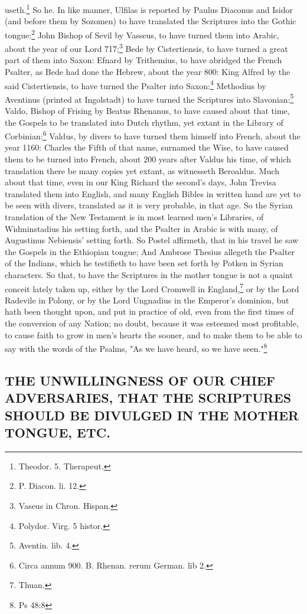 useth.\footnote{Theodor. 5. Therapeut.} So he. In like manner, Ulfilas is reported by Paulus Diaconus and Isidor (and before them by Sozomen) to have translated the Scriptures into the Gothic tongue:\footnote{P. Diacon. li. 12.} John Bishop of Sevil by Vasseus, to have turned them into Arabic, about the year of our Lord 717;\footnote{Vaseus in Chron. Hispan.} Bede by Cistertiensis, to have turned a great part of them into Saxon: Efnard by Trithemius, to have abridged the French Psalter, as Bede had done the Hebrew, about the year 800: King Alfred by the said Cistertiensis, to have turned the Psalter into Saxon:\footnote{Polydor. Virg. 5 histor.} Methodius by Aventinus (printed at Ingolstadt) to have turned the Scriptures into Slavonian:\footnote{Aventin. lib. 4.} Valdo, Bishop of Frising by Beatus Rhenanus, to have caused about that time, the Gospels to be translated into Dutch rhythm, yet extant in the Library of Corbinian:\footnote{Circa annum 900. B. Rhenan. rerum German. lib 2.} Valdus, by divers to have turned them himself into French, about the year 1160: Charles the Fifth of that name, surnamed the Wise, to have caused them to be turned into French, about 200 years after Valdus his time, of which translation there be many copies yet extant, as witnesseth Beroaldus. Much about that time, even in our King Richard the second's days, John Trevisa translated them into English, and many English Bibles in written hand are yet to be seen with divers, translated as it is very probable, in that age. So the Syrian translation of the New Testament is in most learned men's Libraries, of Widminstadius his setting forth, and the Psalter in Arabic is with many, of Augustinus Nebiensis' setting forth. So Postel affirmeth, that in his travel he saw the Gospels in the Ethiopian tongue; And Ambrose Thesius allegeth the Psalter of the Indians, which he testifieth to have been set forth by Potken in Syrian characters. So that, to have the Scriptures in the mother tongue is not a quaint conceit lately taken up, either by the Lord Cromwell in England,\footnote{Thuan.} or by the Lord Radevile in Polony, or by the Lord Ungnadius in the Emperor's dominion, but hath been thought upon, and put in practice of old, even from the first times of the conversion of any Nation; no doubt, because it was esteemed most profitable, to cause faith to grow in men's hearts the sooner, and to make them to be able to say with the words of the Psalms, "As we have heard, so we have seen."\footnote{Ps 48:8}

\subsection{THE UNWILLINGNESS OF OUR CHIEF ADVERSARIES, THAT THE SCRIPTURES SHOULD BE DIVULGED IN THE MOTHER TONGUE, ETC.}

